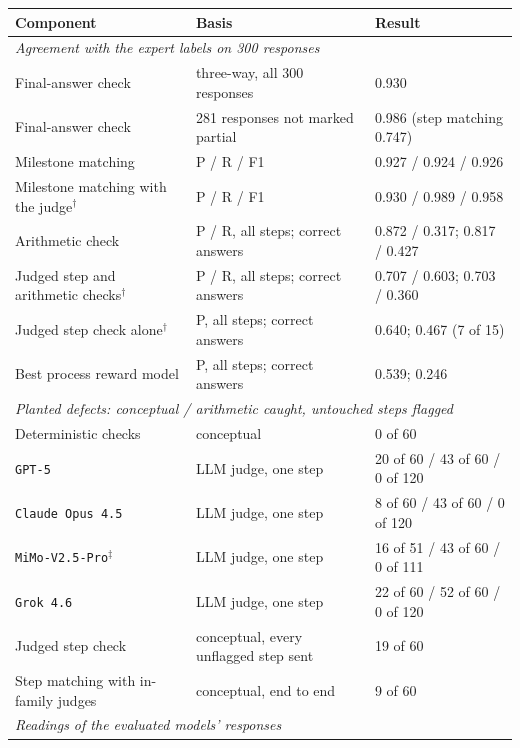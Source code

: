 \begin{table}[t]
    \centering
    \small
    \begin{tabular}{l|l|l}
        \toprule
        \rowcolor{gray!10}
        \textbf{Component} & \textbf{Basis} & \textbf{Result} \\
        \midrule
        \multicolumn{3}{l}{\textit{Agreement with the expert labels on 300 responses}} \\
        Final-answer check & three-way, all 300 responses & 0.930 \\
        Final-answer check & 281 responses not marked partial & 0.986 (step matching 0.747) \\
        Milestone matching & P / R / F1 & 0.927 / 0.924 / 0.926 \\
        Milestone matching with the judge$^\dagger$ & P / R / F1 & 0.930 / 0.989 / 0.958 \\
        Arithmetic check & P / R, all steps; correct answers & 0.872 / 0.317; 0.817 / 0.427 \\
        Judged step and arithmetic checks$^\dagger$ & P / R, all steps; correct answers & 0.707 / 0.603; 0.703 / 0.360 \\
        Judged step check alone$^\dagger$ & P, all steps; correct answers & 0.640; 0.467 (7 of 15) \\
        Best process reward model & P, all steps; correct answers & 0.539; 0.246 \\
        \midrule
        \multicolumn{3}{l}{\textit{Planted defects: conceptual / arithmetic caught, untouched steps flagged}} \\
        Deterministic checks & conceptual & 0 of 60 \\
        \texttt{GPT-5} & LLM judge, one step & 20 of 60 / 43 of 60 / 0 of 120 \\
        \texttt{Claude Opus 4.5} & LLM judge, one step & 8 of 60 / 43 of 60 / 0 of 120 \\
        \texttt{MiMo-V2.5-Pro}$^\ddagger$ & LLM judge, one step & 16 of 51 / 43 of 60 / 0 of 111 \\
        \texttt{Grok 4.6} & LLM judge, one step & 22 of 60 / 52 of 60 / 0 of 120 \\
        Judged step check & conceptual, every unflagged step sent & 19 of 60 \\
        Step matching with in-family judges & conceptual, end to end & 9 of 60 \\
        \midrule
        \multicolumn{3}{l}{\textit{Readings of the evaluated models' responses}} \\

\end{tabular}
\end{table}
